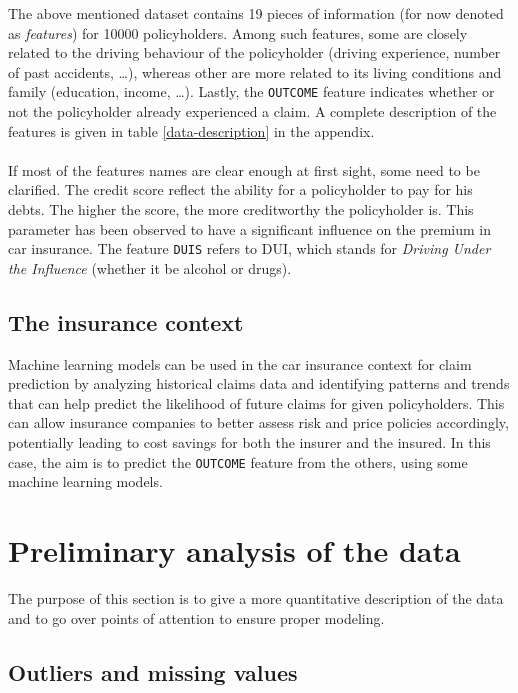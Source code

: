 \documentclass[a4paper,11pt, titlepage]{article}
\begin{document}
The above mentioned dataset contains 19 pieces of information (for now denoted as \textsl{features}) for 10000 policyholders. Among such features, some are closely related to the driving behaviour of the policyholder (driving experience, number of past accidents, \dots), whereas other are more related to its living conditions and family (education, income, \dots). Lastly, the {\tt OUTCOME} feature indicates whether or not the policyholder already experienced a claim. A complete description of the features is given in table \ref{data-description} in the appendix. \\
\\
\noindent If most of the features names are clear enough at first sight, some need to be clarified. The credit score reflect the ability for a policyholder to pay for his debts. The higher the score, the more creditworthy the policyholder is. This parameter has been observed to have a significant influence on the premium in car insurance. The feature {\tt DUIS} refers to DUI, which stands for \textsl{Driving Under the Influence} (whether it be alcohol or drugs).

\subsection{The insurance context}

Machine learning models can be used in the car insurance context for claim prediction by analyzing historical claims data and identifying patterns and trends that can help predict the likelihood of future claims for given policyholders. This can allow insurance companies to better assess risk and price policies accordingly, potentially leading to cost savings for both the insurer and the insured. In this case, the aim is to predict the {\tt OUTCOME} feature from the others, using some machine learning models. 


\section{Preliminary analysis of the data} \label{analysis}

The purpose of this section is to give a more quantitative description of the data and to go over points of attention to ensure proper modeling.

\subsection{Outliers and missing values}
\end{document}
